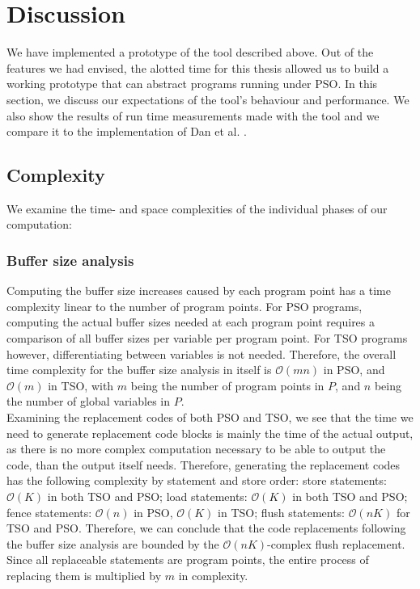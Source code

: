 \section{Discussion}

We have implemented a prototype of the tool described above. Out of the features we had envised, the alotted time for this thesis allowed us to build a working prototype that can abstract programs running under PSO. In this section, we discuss our expectations of the tool's behaviour and performance. We also show the results of run time measurements made with the tool and we compare it to the implementation of Dan et al. \cite{danetal13}.

\subsection{Complexity}

We examine the time- and space complexities of the individual phases of our computation:

\subsubsection{Buffer size analysis}

Computing the buffer size increases caused by each program point has a time complexity linear to the number of program points. For PSO programs, computing the actual buffer sizes needed at each program point requires a comparison of all buffer sizes per variable per program point. For TSO programs however, differentiating between variables is not needed. Therefore, the overall time complexity for the buffer size analysis in itself is $\mathcal{O}(mn)$ in PSO, and $\mathcal{O}(m)$ in TSO, with $m$ being the number of program points in $P$, and $n$ being the number of global variables in $P$.\\

Examining the replacement codes of both PSO and TSO, we see that the time we need to generate replacement code blocks is mainly the time of the actual output, as there is no more complex computation necessary to be able to output the code, than the output itself needs. Therefore, generating the replacement codes has the following complexity by statement and store order: store statements: $\mathcal{O}(K)$ in both TSO and PSO; load statements: $\mathcal{O}(K)$ in both TSO and PSO; fence statements: $\mathcal{O}(n)$ in PSO, $\mathcal{O}(K)$ in TSO; flush statements: $\mathcal{O}(nK)$ for TSO and PSO. Therefore, we can conclude that the code replacements following the buffer size analysis are bounded by the $\mathcal{O}(nK)$-complex flush replacement. Since all replaceable statements are program points, the entire process of replacing them is multiplied by $m$ in complexity.\\

